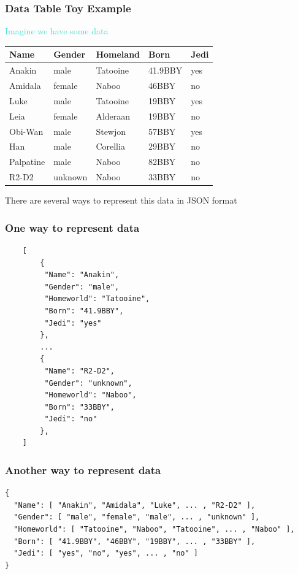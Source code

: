 \documentclass{beamer}\usepackage[]{graphicx}\usepackage[]{color}
\begin{document}

\begin{frame}[fragile]
\frametitle{Data Table Toy Example}

\begin{center}
\textcolor{turquoise}{Imagine we have some data}

\bigskip
\begin{tabular}{l l l l l}
  \hline
  Name & Gender & Homeland & Born & Jedi \\
  \hline
  Anakin & male & Tatooine & 41.9BBY & yes \\  
  Amidala & female & Naboo & 46BBY & no \\
  Luke & male & Tatooine & 19BBY & yes \\
  Leia & female & Alderaan & 19BBY & no \\
  Obi-Wan & male & Stewjon & 57BBY & yes \\
  Han & male & Corellia & 29BBY & no \\
  Palpatine & male & Naboo & 82BBY & no \\
  R2-D2 & unknown & Naboo & 33BBY & no \\
  \hline
 \end{tabular}
\end{center}

There are several ways to represent this data in JSON format

\end{frame}


\begin{frame}[fragile]
\frametitle{One way to represent data}

{\footnotesize
\begin{verbatim}
    [
        {
         "Name": "Anakin",
         "Gender": "male", 
         "Homeworld": "Tatooine",
         "Born": "41.9BBY",
         "Jedi": "yes"
        },
        ...
        {
         "Name": "R2-D2",
         "Gender": "unknown",
         "Homeworld": "Naboo",
         "Born": "33BBY",
         "Jedi": "no"
        },
    ]
\end{verbatim}
}
\end{frame}


\begin{frame}[fragile]
\frametitle{Another way to represent data}

{\footnotesize
\begin{verbatim}
{
  "Name": [ "Anakin", "Amidala", "Luke", ... , "R2-D2" ],
  "Gender": [ "male", "female", "male", ... , "unknown" ],
  "Homeworld": [ "Tatooine", "Naboo", "Tatooine", ... , "Naboo" ],
  "Born": [ "41.9BBY", "46BBY", "19BBY", ... , "33BBY" ],
  "Jedi": [ "yes", "no", "yes", ... , "no" ] 
}

\end{verbatim}
}
\end{frame}
\end{document}
